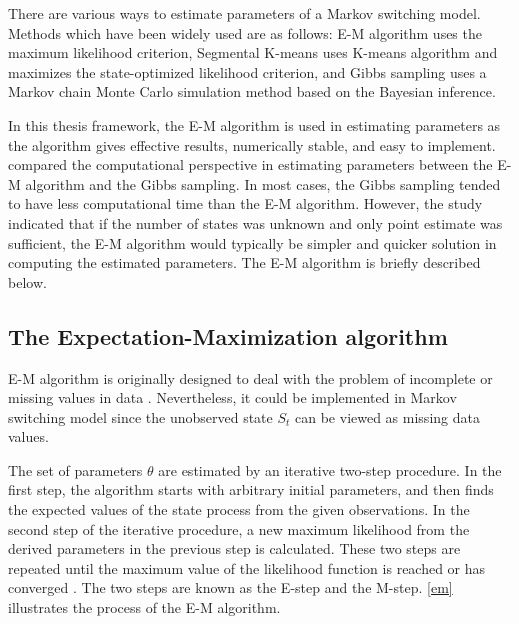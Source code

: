 There are various ways to estimate parameters of a Markov switching
model. Methods which have been widely used are as follows: E-M algorithm
\citep{hamilton1990analysis,kim1994dynamic} uses the maximum likelihood
criterion, Segmental K-means \citep{juang1990segmental} uses K-means
algorithm and maximizes the state-optimized likelihood criterion,
and Gibbs sampling \citep{kim1999state} uses a Markov chain Monte
Carlo simulation method based on the Bayesian inference. 

In this thesis framework, the E-M algorithm is used in estimating
parameters as the algorithm gives effective results, numerically stable,
and easy to implement. \citet{ryden2008versus} compared the computational
perspective in estimating parameters between the E-M algorithm and
the Gibbs sampling. In most cases, the Gibbs sampling tended to have
less computational time than the E-M algorithm. However, the study
indicated that if the number of states was unknown and only point
estimate was sufficient, the E-M algorithm would typically be simpler
and quicker solution in computing the estimated parameters. The E-M
algorithm is briefly described below. %

\subsection{The Expectation-Maximization algorithm}

E-M algorithm is originally designed to deal with the problem of incomplete
or missing values in data \citep{dempster1977maximum}. Nevertheless,
it could be implemented in Markov switching model since the unobserved
state $S_{t}$ can be viewed as missing data values. 

The set of parameters $\theta$ are estimated by an iterative two-step
procedure. In the first step, the algorithm starts with arbitrary
initial parameters, and then finds the expected values of the state
process from the given observations. In the second step of the iterative
procedure, a new maximum likelihood from the derived parameters in
the previous step is calculated. These two steps are repeated until
the maximum value of the likelihood function is reached or has converged
\citep{janczura2012efficient}. The two steps are known as the E-step
and the M-step. \ref{em} illustrates the process of the E-M algorithm.

